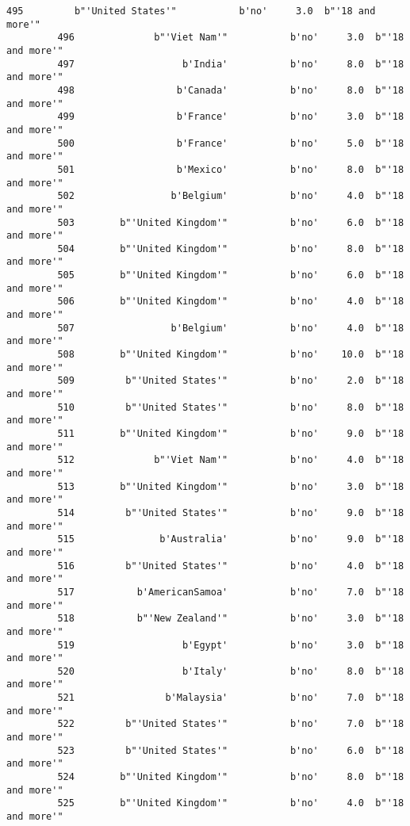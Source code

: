 \documentclass[11pt]{article}
\begin{document}
\begin{Verbatim}[commandchars=\\\{\}]
         495         b"'United States'"           b'no'     3.0  b"'18 and more'"   
         496              b"'Viet Nam'"           b'no'     3.0  b"'18 and more'"   
         497                   b'India'           b'no'     8.0  b"'18 and more'"   
         498                  b'Canada'           b'no'     8.0  b"'18 and more'"   
         499                  b'France'           b'no'     3.0  b"'18 and more'"   
         500                  b'France'           b'no'     5.0  b"'18 and more'"   
         501                  b'Mexico'           b'no'     8.0  b"'18 and more'"   
         502                 b'Belgium'           b'no'     4.0  b"'18 and more'"   
         503        b"'United Kingdom'"           b'no'     6.0  b"'18 and more'"   
         504        b"'United Kingdom'"           b'no'     8.0  b"'18 and more'"   
         505        b"'United Kingdom'"           b'no'     6.0  b"'18 and more'"   
         506        b"'United Kingdom'"           b'no'     4.0  b"'18 and more'"   
         507                 b'Belgium'           b'no'     4.0  b"'18 and more'"   
         508        b"'United Kingdom'"           b'no'    10.0  b"'18 and more'"   
         509         b"'United States'"           b'no'     2.0  b"'18 and more'"   
         510         b"'United States'"           b'no'     8.0  b"'18 and more'"   
         511        b"'United Kingdom'"           b'no'     9.0  b"'18 and more'"   
         512              b"'Viet Nam'"           b'no'     4.0  b"'18 and more'"   
         513        b"'United Kingdom'"           b'no'     3.0  b"'18 and more'"   
         514         b"'United States'"           b'no'     9.0  b"'18 and more'"   
         515               b'Australia'           b'no'     9.0  b"'18 and more'"   
         516         b"'United States'"           b'no'     4.0  b"'18 and more'"   
         517           b'AmericanSamoa'           b'no'     7.0  b"'18 and more'"   
         518           b"'New Zealand'"           b'no'     3.0  b"'18 and more'"   
         519                   b'Egypt'           b'no'     3.0  b"'18 and more'"   
         520                   b'Italy'           b'no'     8.0  b"'18 and more'"   
         521                b'Malaysia'           b'no'     7.0  b"'18 and more'"   
         522         b"'United States'"           b'no'     7.0  b"'18 and more'"   
         523         b"'United States'"           b'no'     6.0  b"'18 and more'"   
         524        b"'United Kingdom'"           b'no'     8.0  b"'18 and more'"   
         525        b"'United Kingdom'"           b'no'     4.0  b"'18 and more'"   

\end{Verbatim}
\end{document}
